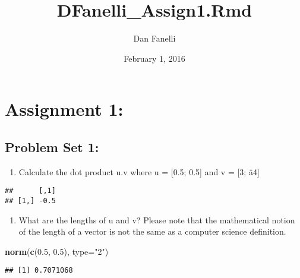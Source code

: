 \documentclass[]{article}
\title{DFanelli\_Assign1.Rmd}
\author{Dan Fanelli}
\date{February 1, 2016}
\newenvironment{Shaded}{\begin{snugshade}}{\end{snugshade}}
\newcommand{\KeywordTok}[1]{\textcolor[rgb]{0.13,0.29,0.53}{\textbf{{#1}}}}
\newcommand{\DataTypeTok}[1]{\textcolor[rgb]{0.13,0.29,0.53}{{#1}}}
\newcommand{\DecValTok}[1]{\textcolor[rgb]{0.00,0.00,0.81}{{#1}}}
\newcommand{\FloatTok}[1]{\textcolor[rgb]{0.00,0.00,0.81}{{#1}}}
\newcommand{\StringTok}[1]{\textcolor[rgb]{0.31,0.60,0.02}{{#1}}}
\newcommand{\NormalTok}[1]{{#1}}
\begin{document}
\maketitle


\section{Assignment 1:}\label{assignment-1}

\subsection{Problem Set 1:}\label{problem-set-1}

\begin{enumerate}
\def\labelenumi{(\arabic{enumi})}
\itemsep1pt\parskip0pt
\item
  Calculate the dot product u.v where u = {[}0.5; 0.5{]} and v = {[}3;
  â4{]}
\end{enumerate}

\begin{Shaded}
\end{Shaded}

\begin{verbatim}
##      [,1]
## [1,] -0.5
\end{verbatim}

\begin{enumerate}
\def\labelenumi{(\arabic{enumi})}
\setcounter{enumi}{1}
\itemsep1pt\parskip0pt
\item
  What are the lengths of u and v? Please note that the mathematical
  notion of the length of a vector is not the same as a computer science
  definition.
\end{enumerate}

\begin{Shaded}
\begin{Highlighting}[]
\KeywordTok{norm}\NormalTok{(}\KeywordTok{c}\NormalTok{(}\FloatTok{0.5}\NormalTok{, }\FloatTok{0.5}\NormalTok{), }\DataTypeTok{type=}\StringTok{"2"}\NormalTok{)}
\end{Highlighting}
\end{Shaded}

\begin{verbatim}
## [1] 0.7071068
\end{verbatim}
\end{document}
